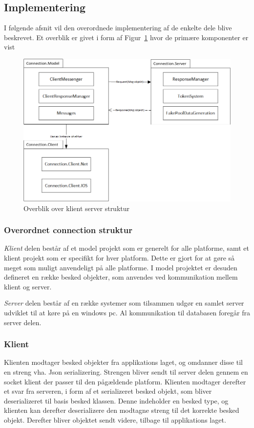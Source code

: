 \subsection{Implementering}
I følgende afsnit vil den overordnede implementering af de enkelte dele blive beskrevet. Et overblik er givet i form af Figur~\ref{fig:klientserver} hvor de primære komponenter er vist

\begin{figure}
	\centering
	\includegraphics[width=0.7\linewidth]{figs/design/klientserver.PNG}
	\caption{Overblik over klient server struktur}
	\label{fig:klientserver}
\end{figure}

\subsubsection{Overordnet connection struktur}
\textit{Klient} delen består af et model projekt som er generelt for alle platforme, samt et klient projekt som er specifikt for hver platform. Dette er gjort for at gøre så meget som muligt anvendeligt på alle platforme. I model projektet er desuden defineret en række besked objekter, som anvendes ved kommunikation mellem klient og server.

\textit{Server} delen består af en række systemer som tilsammen udgør en samlet server udviklet til at køre på en windows pc. Al kommunikation til databasen foregår fra server delen.

\subsubsection{Klient}
Klienten modtager besked objekter fra applikations laget, og omdanner disse til en streng vha. Json serializering. Strengen bliver sendt til server delen gennem en socket klient der passer til den pågældende platform.
Klienten modtager derefter et svar fra serveren, i form af et serializeret besked objekt, som bliver deserializeret til basis besked klassen. Denne indeholder en besked type, og klienten kan derefter deserializere den modtagne streng til det korrekte besked objekt. Derefter bliver objektet sendt videre, tilbage til applikations laget. 

